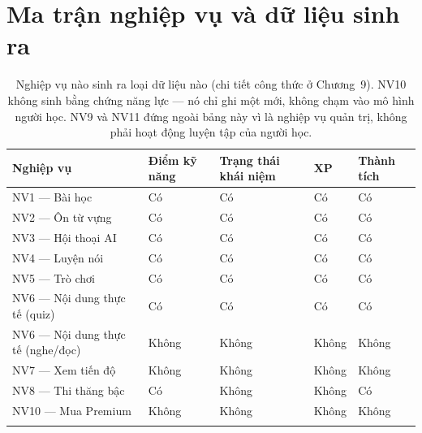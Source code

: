 \section{Ma trận nghiệp vụ và dữ liệu sinh ra}

\begin{longtable}{L{3.6cm} L{2.2cm} L{2.4cm} L{2.0cm} L{2.4cm}}
\toprule
\textbf{Nghiệp vụ} & \textbf{Điểm kỹ năng} & \textbf{Trạng thái khái niệm} & \textbf{XP} & \textbf{Thành tích}\\
\midrule
\endhead
NV1 — Bài học & Có & Có & Có & Có\\
NV2 — Ôn từ vựng & Có & Có & Có & Có\\
NV3 — Hội thoại AI & Có & Có & Có & Có\\
NV4 — Luyện nói & Có & Có & Có & Có\\
NV5 — Trò chơi & Có & Có & Có & Có\\
NV6 — Nội dung thực tế (quiz) & Có & Có & Có & Có\\
NV6 — Nội dung thực tế (nghe/đọc) & Không & Không & Không & Không\\
NV7 — Xem tiến độ & Không & Không & Không & Không\\
NV8 — Thi thăng bậc & Có & Không & Không & Có\\
NV10 — Mua Premium & Không & Không & Không & Không\\
\bottomrule
\caption{Nghiệp vụ nào sinh ra loại dữ liệu nào (chi tiết công thức ở Chương~9). NV10 không
sinh bằng chứng năng lực — nó chỉ ghi một  mới, không chạm vào mô hình
người học. NV9 và NV11 đứng ngoài bảng này vì là nghiệp vụ quản trị, không phải hoạt động
luyện tập của người học.}
\end{longtable}
